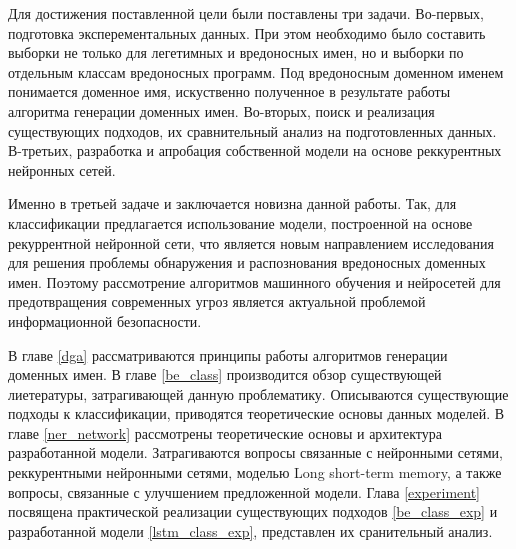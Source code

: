 Для достижения поставленной цели были поставлены три задачи. Во-первых, подготовка эксперементальных данных. При этом необходимо было составить выборки не только для легетимных и вредоносных имен, но и выборки по отдельным классам вредоносных программ. Под вредоносным доменном именем понимается доменное имя, искуственно полученное в результате работы алгоритма генерации доменных имен. Во-вторых, поиск и реализация существующих подходов, их сравнительный анализ на подготовленных данных. В-третьих, разработка и апробация собственной модели на основе реккурентных нейронных сетей.

Именно в третьей задаче и заключается новизна данной работы. Так, для классификации предлагается использование модели, построенной на основе рекуррентной нейронной сети, что является новым направлением исследования для решения проблемы обнаружения и распознования вредоносных доменных имен. Поэтому рассмотрение алгоритмов машинного обучения и нейросетей для предотвращения современных угроз является актуальной проблемой информационной безопасности.

В главе \ref{dga} рассматриваются принципы работы алгоритмов генерации доменных имен.
В главе \ref{be_class} производится обзор существующей лиетературы, затрагивающей данную проблематику. Описываются существующие подходы к классификации, приводятся теоретические основы данных моделей.
В главе \ref{ner_network} рассмотрены теоретические основы и архитектура разработанной модели. Затрагиваются вопросы связанные с нейронными сетями, реккурентными нейронными сетями, моделью Long short-term memory, а также вопросы, связанные с улучшением предложенной модели.
Глава \ref{experiment} посвящена практической реализации существующих подходов \ref{be_class_exp} и разработанной модели \ref{lstm_class_exp}, представлен их сранительный анализ.
\clearpage